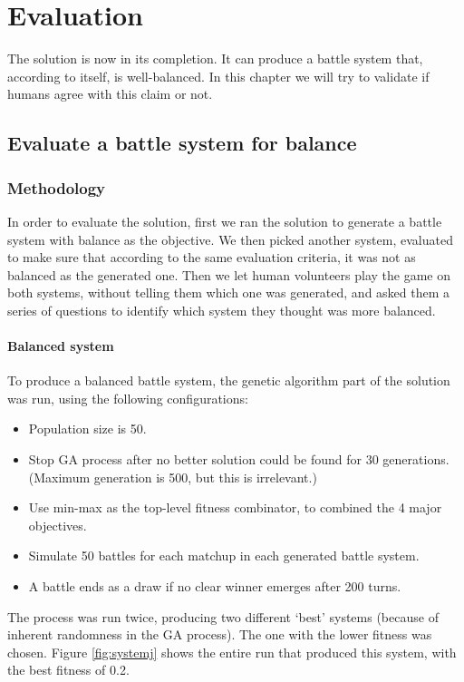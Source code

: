\chapter{Evaluation}

The solution is now in its completion. It can produce a battle system that,  according to itself, is well-balanced. In this chapter we will try to validate if humans agree with this claim or not.

\section{Evaluate a battle system for balance}

\subsection{Methodology}
\label{sub:meth}

In order to evaluate the solution, first we ran the solution to generate a battle system with balance as the objective. We then picked another system, evaluated to make sure that according to the same evaluation criteria, it was not as balanced as the generated one. Then we let human volunteers play the game on both systems, without telling them which one was generated, and asked them a series of questions to identify which system they thought was more balanced.

\subsubsection*{Balanced system}

To produce a balanced battle system, the genetic algorithm part of the solution was run, using the following configurations:
\begin{itemize}
	\item Population size is 50.
	\item Stop GA process after no better solution could be found for 30 generations. (Maximum generation is 500, but this is irrelevant.)
	\item Use min-max as the top-level fitness combinator, to combined the 4 major objectives.
	\item Simulate 50 battles for each matchup in each generated battle system.
	\item A battle ends as a draw if no clear winner emerges after 200 turns.
\end{itemize}

The process was run twice, producing two different `best' systems (because of inherent randomness in the GA process). The one with the lower fitness was chosen. Figure \ref{fig:systemj} shows the entire run that produced this system, with the best fitness of 0.2.

